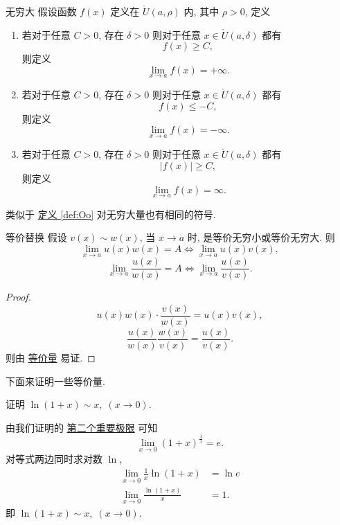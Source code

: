 \documentclass[cn,toc=twocol]{elegantbook}
\newcommand{\ITEMS}{\begin{enumerate}}
\newcommand{\ITEME}{\end{enumerate}}
\begin{document}
\begin{definition}{无穷大}
假设函数 $f(x)$ 定义在 $\mathring{U}(a,\rho)$ 内, 其中 $\rho > 0$, 定义
\ITEMS
\item 若对于任意 $C > 0$, 存在 $\delta > 0$ 则对于任意 $x \in \mathring{U}(a,\delta)$ 都有
\[
	f(x) \ge C,
\]
则定义
\[
\lim_{x \to a} f(x) = +\infty.
\]

\item 若对于任意 $C > 0$, 存在 $\delta > 0$ 则对于任意 $x \in \mathring{U}(a,\delta)$ 都有
\[
	f(x) \le -C,
\]
则定义
\[
\lim_{x \to a} f(x) = -\infty.
\]

\item 若对于任意 $C > 0$, 存在 $\delta > 0$ 则对于任意 $x \in \mathring{U}(a,\delta)$ 都有
\[
	\lvert f(x) \rvert \ge C,
\]
则定义
\[
\lim_{x \to a} f(x) = \infty.
\]

\ITEME
\end{definition}

类似于 \hyperref[def:Oo]{定义 \ref*{def:Oo}} 对无穷大量也有相同的符号.

\begin{theorem}{等价替换}
	假设 $v(x) \sim w(x)$, 当 $x \to a$ 时, 是等价无穷小或等价无穷大. 则
	\[
	\lim_{x \to a} u(x) w(x) = A \iff \lim_{x \to a} u(x) v(x),
	\]
	\[
	\lim_{x \to a} \frac{u(x)}{w(x)} = A \iff \lim_{x \to a} \frac{u(x)}{v(x)}.
	\]
\end{theorem}

\begin{proof}
\[
	u(x) w(x) \cdot \frac{v(x)}{w(x)} = u(x) v(x),
\]
\[
	\frac{u(x)}{w(x)}\frac{w(x)}{v(x)} = \frac{u(x)}{v(x)}.
\]
则由 \hyperref[def:Oo]{等价量} 易证.
\end{proof}

\vspace{0.4em}
下面来证明一些等价量.
\vspace{0.4em}

\begin{example}
	证明 $\ln (1+x) \sim x, \;(x \to 0)$. 
\end{example}
\begin{solution}
	由我们证明的 \hyperref[thm:elimit]{第二个重要极限} 可知
	\[
	\lim_{x \to 0} (1 + x)^{\frac{1}{x}} = e.
	\]
	对等式两边同时求对数 $\ln$,
	\[
	\begin{aligned}
		\lim_{x \to 0} \frac{1}{x} \ln (1 + x) &= \ln e\\
		\lim_{x \to 0} \frac{\ln (1 + x)}{x} &= 1.
	\end{aligned}
	\]
	即 $\ln (1+x) \sim x, \;(x \to 0)$.
\end{solution}
\end{document}

